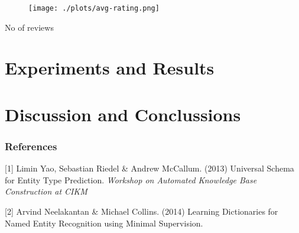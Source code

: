 \documentclass{article} %
\begin{document}
\begin{figure}[h]
  \begin{center}
    \texttt{[image: ./plots/avg-rating.png]}
    \label{fig:}
    \caption{}
  \end{center}
\end{figure}


No of reviews 





\section{Experiments and Results}
\section{Discussion and Conclussions}

\subsubsection*{References}


\small{
[1] Limin Yao, Sebastian Riedel \& Andrew McCallum. (2013) 
Universal Schema for Entity Type Prediction. 
{\it Workshop on Automated Knowledge Base Construction at CIKM }

[2] Arvind Neelakantan \& Michael Collins. (2014)
Learning Dictionaries for Named Entity Recognition using Minimal Supervision. 
}
\end{document}
